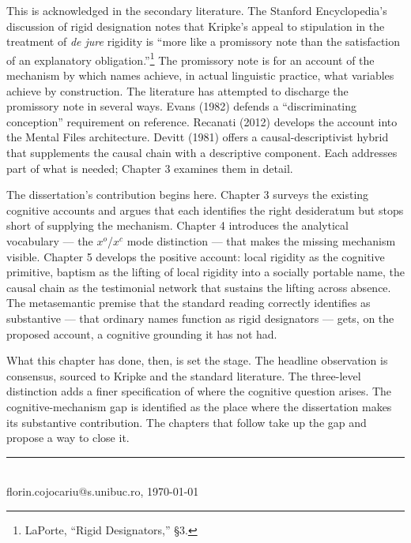 \documentclass[10pt]{article}
\begin{document}
This is acknowledged in the secondary literature. The Stanford Encyclopedia's discussion of rigid designation notes that Kripke's appeal to stipulation in the treatment of \emph{de jure} rigidity is ``more like a promissory note than the satisfaction of an explanatory obligation.''\footnote{LaPorte, ``Rigid Designators,'' §3.} The promissory note is for an account of the mechanism by which names achieve, in actual linguistic practice, what variables achieve by construction. The literature has attempted to discharge the promissory note in several ways. Evans (1982) defends a ``discriminating conception'' requirement on reference. Recanati (2012) develops the account into the Mental Files architecture. Devitt (1981) offers a causal-descriptivist hybrid that supplements the causal chain with a descriptive component. Each addresses part of what is needed; Chapter 3 examines them in detail.

The dissertation's contribution begins here. Chapter 3 surveys the existing cognitive accounts and argues that each identifies the right desideratum but stops short of supplying the mechanism. Chapter 4 introduces the analytical vocabulary --- the \(x^o\)/\(x^c\) mode distinction --- that makes the missing mechanism visible. Chapter 5 develops the positive account: local rigidity as the cognitive primitive, baptism as the lifting of local rigidity into a socially portable name, the causal chain as the testimonial network that sustains the lifting across absence. The metasemantic premise that the standard reading correctly identifies as substantive --- that ordinary names function as rigid designators --- gets, on the proposed account, a cognitive grounding it has not had.

What this chapter has done, then, is set the stage. The headline observation is consensus, sourced to Kripke and the standard literature. The three-level distinction adds a finer specification of where the cognitive question arises. The cognitive-mechanism gap is identified as the place where the dissertation makes its substantive contribution. The chapters that follow take up the gap and propose a way to close it.

\vfill
\noindent\rule{\textwidth}{0.35pt}\\[1pt]
{\tiny florin.cojocariu@s.unibuc.ro, \today}
\end{document}

